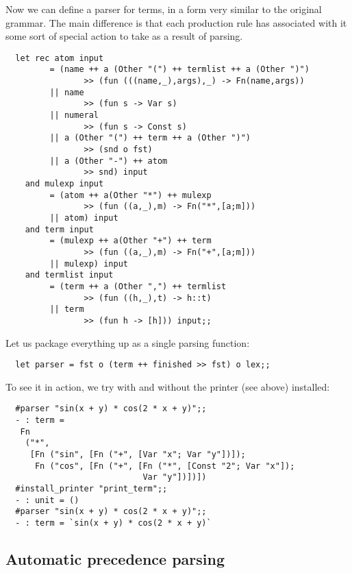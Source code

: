 \noindent Now we can define a parser for terms, in a form very similar to the
original grammar. The main difference is that each production rule has
associated with it some sort of special action to take as a result of parsing.

\begin{boxed}\begin{verbatim}
  let rec atom input
         = (name ++ a (Other "(") ++ termlist ++ a (Other ")")
                >> (fun (((name,_),args),_) -> Fn(name,args))
         || name
                >> (fun s -> Var s)
         || numeral
                >> (fun s -> Const s)
         || a (Other "(") ++ term ++ a (Other ")")
                >> (snd o fst)
         || a (Other "-") ++ atom
                >> snd) input
    and mulexp input
         = (atom ++ a(Other "*") ++ mulexp
                >> (fun ((a,_),m) -> Fn("*",[a;m]))
         || atom) input
    and term input
         = (mulexp ++ a(Other "+") ++ term
                >> (fun ((a,_),m) -> Fn("+",[a;m]))
         || mulexp) input
    and termlist input
         = (term ++ a (Other ",") ++ termlist
                >> (fun ((h,_),t) -> h::t)
         || term
                >> (fun h -> [h])) input;;
\end{verbatim}\end{boxed}

\noindent Let us package everything up as a single parsing function:

\begin{boxed}\begin{verbatim}
  let parser = fst o (term ++ finished >> fst) o lex;;
\end{verbatim}\end{boxed}

\noindent To see it in action, we try with and without the printer (see above)
installed:

\begin{boxed}\begin{verbatim}
  #parser "sin(x + y) * cos(2 * x + y)";;
  - : term =
   Fn
    ("*",
     [Fn ("sin", [Fn ("+", [Var "x"; Var "y"])]);
      Fn ("cos", [Fn ("+", [Fn ("*", [Const "2"; Var "x"]);
                            Var "y"])])])
  #install_printer "print_term";;
  - : unit = ()
  #parser "sin(x + y) * cos(2 * x + y)";;
  - : term = `sin(x + y) * cos(2 * x + y)`
\end{verbatim}\end{boxed}

\subsection{Automatic precedence parsing}

